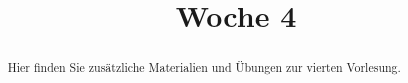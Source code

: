 \documentclass{ximera}
\title{Woche 4}
\begin{document}
\begin{abstract}
Hier finden Sie zusätzliche Materialien und Übungen zur vierten Vorlesung.
\end{abstract}
\maketitle
\end{document}
